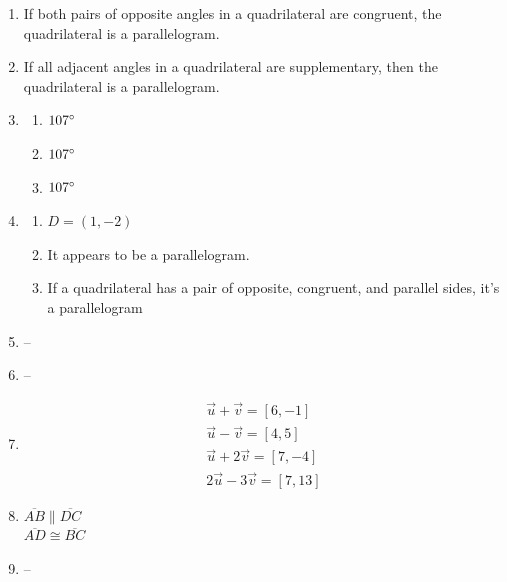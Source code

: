 \documentclass{article}
\begin{document}
\begin{enumerate}
\item If both pairs of opposite angles in a quadrilateral are congruent, the quadrilateral is a parallelogram.

\item If all adjacent angles in a quadrilateral are supplementary, then the quadrilateral is a parallelogram. 

\item

	\begin{enumerate}
	
	\item $107 \degree$
	
	\item $107 \degree$
	
	\item $107 \degree$
	
	\end{enumerate}
	
\item

	\begin{enumerate}
	
	\item $D = (1, -2)$
	
	\item It appears to be a parallelogram.
	
	\item If a quadrilateral has a pair of opposite, congruent, and parallel sides, it's a parallelogram
	
	\end{enumerate}
	
\item --

\item --

\item

	\begin{gather*}
	\vec{u} + \vec{v} = [6, -1] \\
	\vec{u} - \vec{v} = [4, 5] \\
	\vec{u} + 2\vec{v} = [7, -4] \\
	2\vec{u} - 3\vec{v} = [7, 13]
	\end{gather*}
	
\item $\overline{AB} \parallel \overline{DC}$ \\
	$\overline{AD} \cong \overline{BC}$
	
\item --


\end{enumerate}
\end{document}
